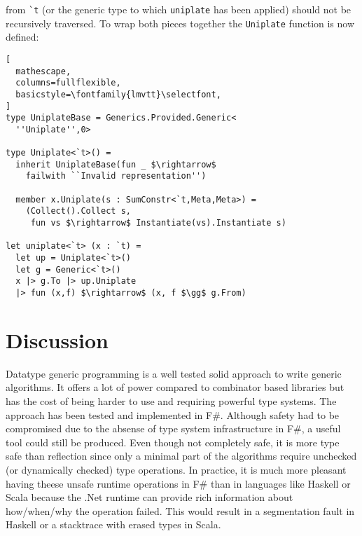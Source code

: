 \documentclass{sigplanconf}
\begin{document}
from \verb+`t+ (or the generic type to which \verb+uniplate+
has been applied) should not be recursively traversed.
To wrap both pieces together the \verb+Uniplate+ function
is now defined:
\begin{lstlisting}[
  mathescape,
  columns=fullflexible,
  basicstyle=\fontfamily{lmvtt}\selectfont,
]
type UniplateBase = Generics.Provided.Generic<
  ''Uniplate'',0>

type Uniplate<`t>() =
  inherit UniplateBase(fun _ $\rightarrow$ 
    failwith ``Invalid representation'')

  member x.Uniplate(s : SumConstr<`t,Meta,Meta>) =
    (Collect().Collect s,
     fun vs $\rightarrow$ Instantiate(vs).Instantiate s)

let uniplate<`t> (x : `t) =
  let up = Uniplate<`t>()
  let g = Generic<`t>()
  x |> g.To |> up.Uniplate
  |> fun (x,f) $\rightarrow$ (x, f $\gg$ g.From)

\end{lstlisting}



\section{Discussion}
Datatype generic programming is a well tested solid approach
to write generic algorithms. It offers a lot of power compared
to combinator based libraries but has the cost of being
harder to use and requiring powerful type systems. The approach
has been tested and implemented in F\#. Although safety had
to be compromised due to the absense of type system infrastructure
in F\#, a useful tool could still be produced. Even though
not completely safe, it is more type safe than reflection since
only a minimal part of the algorithms require unchecked
(or dynamically checked) type operations. In practice, it is
much more pleasant having theese unsafe runtime 
operations in F\# than in languages like Haskell or Scala
because the .Net runtime can provide rich information
about how/when/why the operation failed. This would result
in a segmentation fault in Haskell or a stacktrace with
erased types in Scala.
\end{document}
